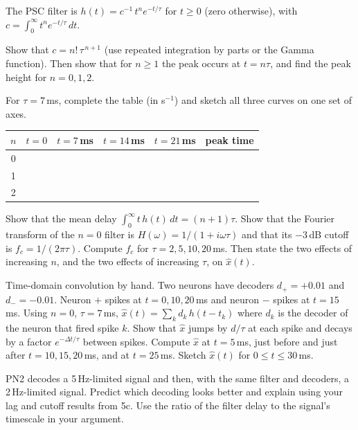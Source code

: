 \documentclass[10pt,letterpaper]{article}
\newcommand{\qsec}[1]{\vspace{8pt}{\large\bfseries #1}\par\vspace{2pt}}
\begin{document}
\qsec{5. Post-synaptic current filters}
The PSC filter is $h(t) = c^{-1}\,t^n e^{-t/\tau}$ for $t \ge 0$ (zero otherwise), with $c = \int_0^\infty t^n e^{-t/\tau}\,dt$.

\begin{parts}
\item[5a.] Show that $c = n!\,\tau^{\,n+1}$ (use repeated integration by parts or the Gamma function). Then show that for $n \ge 1$ the peak occurs at $t = n\tau$, and find the peak height for $n = 0, 1, 2$.

\item[5b.] For $\tau = 7$\,ms, complete the table (in s$^{-1}$) and sketch all three curves on one set of axes.

\begin{center}
\begin{tabular}{cccccc}
\toprule
$n$ & $t=0$ & $t=7$\,ms & $t=14$\,ms & $t=21$\,ms & peak time \\
\midrule
0 & & & & & \\
1 & & & & & \\
2 & & & & & \\
\bottomrule
\end{tabular}
\end{center}

\item[5c.] Show that the mean delay $\int_0^\infty t\,h(t)\,dt = (n+1)\tau$. Show that the Fourier transform of the $n = 0$ filter is $H(\omega) = 1/(1 + i\omega\tau)$ and that its $-3$\,dB cutoff is $f_c = 1/(2\pi\tau)$. Compute $f_c$ for $\tau = 2, 5, 10, 20$\,ms. Then state the two effects of increasing $n$, and the two effects of increasing $\tau$, on $\hat x(t)$.

\item[5d.] Time-domain convolution by hand. Two neurons have decoders $d_{+} = +0.01$ and $d_{-} = -0.01$. Neuron $+$ spikes at $t = 0, 10, 20$\,ms and neuron $-$ spikes at $t = 15$\,ms. Using $n = 0$, $\tau = 7$\,ms, $\hat x(t) = \sum_k d_k\, h(t - t_k)$ where $d_k$ is the decoder of the neuron that fired spike $k$. Show that $\hat x$ jumps by $d/\tau$ at each spike and decays by a factor $e^{-\Delta t/\tau}$ between spikes. Compute $\hat x$ at $t = 5$\,ms, just before and just after $t = 10, 15, 20$\,ms, and at $t = 25$\,ms. Sketch $\hat x(t)$ for $0 \le t \le 30$\,ms.

\item[5e.] PN2 decodes a 5\,Hz-limited signal and then, with the same filter and decoders, a 2\,Hz-limited signal. Predict which decoding looks better and explain using your lag and cutoff results from 5c. Use the ratio of the filter delay to the signal's timescale in your argument.
\end{parts}
\end{document}
